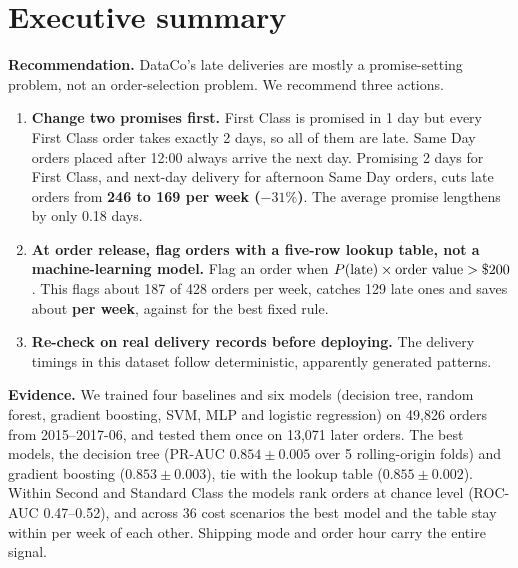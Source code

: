 \section{Executive summary}
\label{sec:summary}

\textbf{Recommendation.} DataCo's late deliveries are mostly a promise-setting problem, not an
order-selection problem. We recommend three actions.
\begin{enumerate}
  \item \textbf{Change two promises first.} First Class is promised in 1 day but every First Class
        order takes exactly 2 days, so all of them are late. Same Day orders placed after 12:00
        always arrive the next day. Promising 2 days for First Class, and next-day delivery for
        afternoon Same Day orders, cuts late orders from \textbf{246 to 169 per week ($-31\%$)}.
        The average promise lengthens by only 0.18 days.
  \item \textbf{At order release, flag orders with a five-row lookup table, not a
        machine-learning model.} Flag an order when $P(\text{late})\times\text{order value} >
        \$200$. This flags about 187 of 428 orders per week, catches 129 late ones and
        saves about \textbf{ per week}, against  for the best fixed rule.
  \item \textbf{Re-check on real delivery records before deploying.} The delivery timings in this
        dataset follow deterministic, apparently generated patterns.
\end{enumerate}

\textbf{Evidence.} We trained four baselines and six models (decision tree, random forest,
gradient boosting, SVM, MLP and logistic regression) on 49{,}826 orders from 2015--2017-06,
and tested them once on 13{,}071 later orders. The best models, the decision tree (PR-AUC
$0.854 \pm 0.005$ over 5 rolling-origin folds) and gradient boosting ($0.853 \pm 0.003$), tie
with the lookup table ($0.855 \pm 0.002$). Within Second and Standard Class the models rank
orders at chance level (ROC-AUC 0.47--0.52), and across 36 cost scenarios the best model and
the table stay within  per week of each other. Shipping mode and order hour carry the
entire signal.

